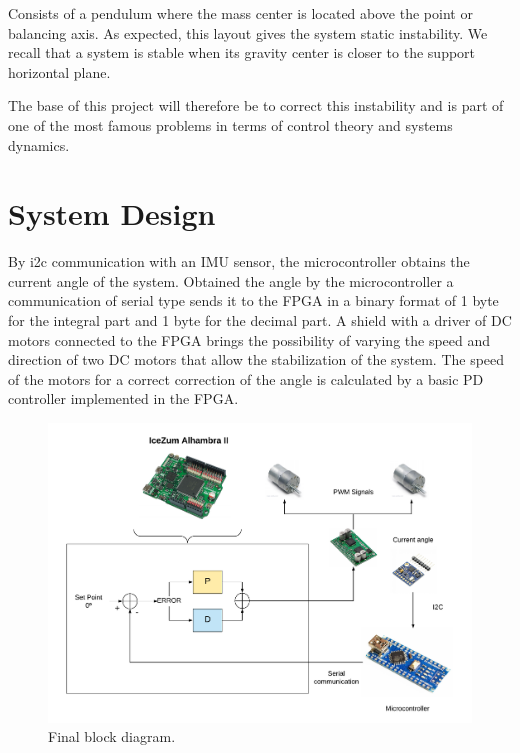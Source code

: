 Consists of a pendulum where the mass center is located above the point or balancing axis. As expected, this layout gives the system static instability. We recall that a system is stable when its gravity center is closer to the support horizontal plane. \newline

The base of this project will therefore be to correct this instability and is part of one of the most famous problems in terms of control theory and systems dynamics. 

\newpage
\section{System Design}\label{sec:Diseno}

By i2c communication with an IMU sensor, the microcontroller obtains the current angle of the system. Obtained the angle by the microcontroller a communication of serial type sends it to the FPGA in a binary format of 1 byte for the integral part and 1 byte for the decimal part. A shield with a driver of DC motors connected to the FPGA brings the possibility of varying the speed and direction of two DC motors that allow the stabilization of the system. The speed of the motors for a correct correction of the angle is calculated by a basic PD controller implemented in the FPGA.

\begin{center}
	\begin{figure}[H]
		\center
		\includegraphics[trim = 0mm 0mm 0mm 0mm,clip, angle=0, scale = 0.4]{imagenes/Balancing_Robot/final.pdf}
		\caption{Final block diagram.}
		\label{fig:final}
	\end{figure}
\end{center}

